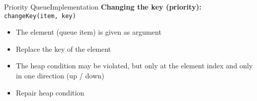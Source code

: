 \begin{frame}{Priority Queue}{Implementation}
  \textbf{Changing the key (priority):}
  {\color{Mittel-Blau}\texttt{changeKey(item, key)}}
  \begin{itemize}
    \item
      The element (queue item) is given as argument
    \item
      Replace the key of the element
    \item
      The {\color{Mittel-Blau}heap condition} may be violated, but only at the
      element index and only in one direction (up / down)
    \item
      Repair {\color{Mittel-Blau}heap condition}
  \end{itemize}
    \begin{figure}[!h]
      \begin{adjustbox}{height=0.275\linewidth}
      \end{adjustbox}
      \hspace{0.25em}\hspace{-1.5em}
      \begin{adjustbox}{height=0.275\linewidth}
      \end{adjustbox}
      \label{fig:priority_queue:impl_change_key}%
    \end{figure}%
\end{frame}


